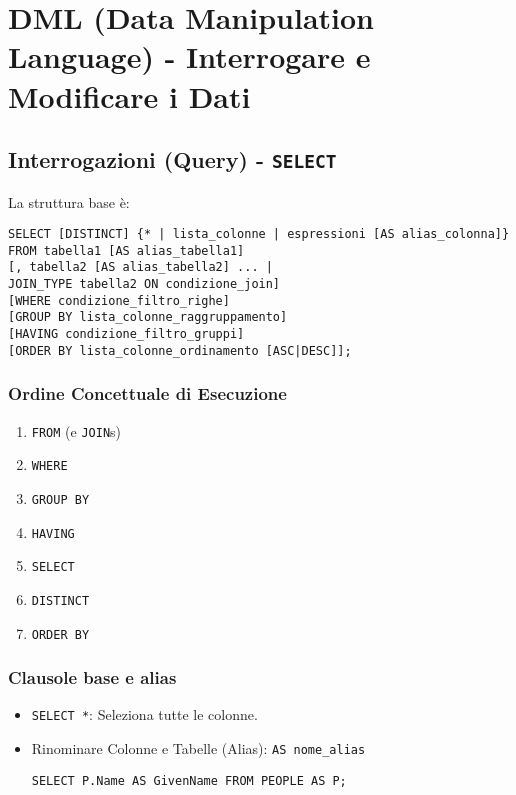 	\vspace{0.5em}
	\noindent
	
	\section{DML (Data Manipulation Language) - Interrogare e Modificare i Dati}
	
	\subsection{Interrogazioni (Query) - \texttt{SELECT}}
	La struttura base è:
	\begin{verbatim}
SELECT [DISTINCT] {* | lista_colonne | espressioni [AS alias_colonna]}
FROM tabella1 [AS alias_tabella1]
[, tabella2 [AS alias_tabella2] ... |
JOIN_TYPE tabella2 ON condizione_join]
[WHERE condizione_filtro_righe]
[GROUP BY lista_colonne_raggruppamento]
[HAVING condizione_filtro_gruppi]
[ORDER BY lista_colonne_ordinamento [ASC|DESC]];
	\end{verbatim}
	
	\subsubsection{Ordine Concettuale di Esecuzione}
	\begin{enumerate}
		\item \texttt{FROM} (e \texttt{JOIN}s)
		\item \texttt{WHERE}
		\item \texttt{GROUP BY}
		\item \texttt{HAVING}
		\item \texttt{SELECT}
		\item \texttt{DISTINCT}
		\item \texttt{ORDER BY}
	\end{enumerate}
	
	\subsubsection{Clausole base e alias}
	\begin{itemize}
		\item \texttt{SELECT *}: Seleziona tutte le colonne.
		\item Rinominare Colonne e Tabelle (Alias): \texttt{AS nome\_alias}
		\begin{verbatim}
SELECT P.Name AS GivenName FROM PEOPLE AS P;
		\end{verbatim}
	\end{itemize}
	
